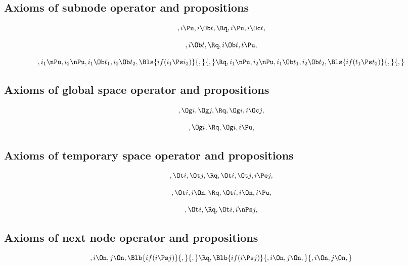 \bigskip
\bigskip
\bigskip
\bigskip
\subsection{ Axioms of subnode operator and propositions}
\[,i \Pu, i \Ob t, \Rq , i \Pu, i \Oc t,\]

\[, i \Ob t, \Rq ,i \Ob t, t \Pu,\]

\[,i_1 \nPu, i_2 \nPu, i_1 \Ob t_1, i_2 \Ob t_2, \Bls{if(i_1 \Ps i_2)}{,}{,} \Rq ,i_1 \nPu, i_2 \nPu, i_1 \Ob t_1, i_2 \Ob t_2, \Bls{if(t_1 \Ps t_2)}{,}{,}\]


\bigskip
\bigskip
\bigskip
\bigskip
\subsection{ Axioms of global space operator and propositions}
\[,\Og i, \Og j, \Rq , \Og i, i \Oc j,\]


\[, \Og i, \Rq , \Og i, i \Pu ,\]


\bigskip
\bigskip
\bigskip
\bigskip
\subsection{ Axioms of  temporary space operator and propositions}
\[, \Ot i, \Ot j, \Rq , \Ot i, \Ot j, i \Pe j,\]

\[, \Ot i, i \On, \Rq , \Ot i, i \On, i \Pu,\]

\[,\Ot i, \Rq , \Ot i, i \nPs j,\]


\bigskip
\bigskip
\bigskip
\bigskip
\subsection{ Axioms of next node operator and propositions}
\[,i \On, j \On, \Blb{if(i \Ps j)}{,}{,} \Rq , \Blb{if(i \Ps j)}{,i \On, j \On,}{,i \On, j \On,}\]

\newpage











